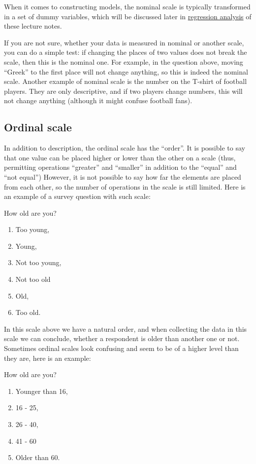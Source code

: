 \documentclass[
]{book}
\providecommand{\tightlist}{%
  \setlength{\itemsep}{0pt}\setlength{\parskip}{0pt}}
\theoremstyle{definition}
\theoremstyle{definition}
\theoremstyle{definition}
\theoremstyle{definition}
\theoremstyle{remark}
\begin{document}
When it comes to constructing models, the nominal scale is typically transformed in a set of dummy variables, which will be discussed later in \hyperref[regression]{regression analysis} of these lecture notes.

If you are not sure, whether your data is measured in nominal or another scale, you can do a simple test: if changing the places of two values does not break the scale, then this is the nominal one. For example, in the question above, moving ``Greek'' to the first place will not change anything, so this is indeed the nominal scale. Another example of nominal scale is the number on the T-shirt of football players. They are only descriptive, and if two players change numbers, this will not change anything (although it might confuse football fans).

\subsection{Ordinal scale}\label{ordinal-scale}

In addition to description, the ordinal scale has the ``order''. It is possible to say that one value can be placed higher or lower than the other on a scale (thus, permitting operations ``greater'' and ``smaller'' in addition to the ``equal'' and ``not equal'') However, it is not possible to say how far the elements are placed from each other, so the number of operations in the scale is still limited. Here is an example of a survey question with such scale:

How old are you?

\begin{enumerate}
\def\labelenumi{\arabic{enumi}.}
\tightlist
\item
  Too young,
\item
  Young,
\item
  Not too young,
\item
  Not too old
\item
  Old,
\item
  Too old.
\end{enumerate}

In this scale above we have a natural order, and when collecting the data in this scale we can conclude, whether a respondent is older than another one or not. Sometimes ordinal scales look confusing and seem to be of a higher level than they are, here is an example:

How old are you?

\begin{enumerate}
\def\labelenumi{\arabic{enumi}.}
\tightlist
\item
  Younger than 16,
\item
  16 - 25,
\item
  26 - 40,
\item
  41 - 60
\item
  Older than 60.
\end{enumerate}
\end{document}
